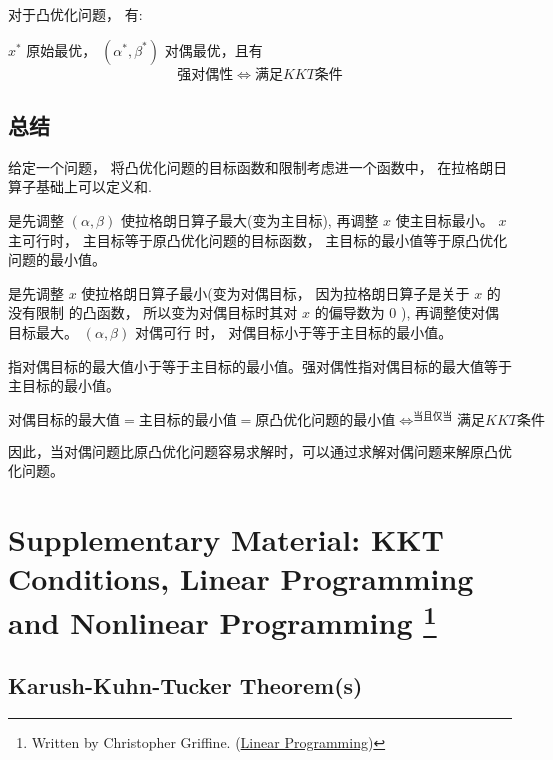 \begin{theorem}
    对于凸优化问题， 有:

$ x^{*} $ 原始最优， $ \left(\alpha^{*}, \beta^{*}\right) $ 对偶最优，且有\begin{equation} 强对偶性 \Leftrightarrow  满足  K K T  条件\end{equation}
\end{theorem}

\subsection{总结}


给定一个问题， 将凸优化问题的目标函数和限制考虑进一个函数中， 在拉格朗日算子基础上可以定义和.

是先调整 $ (\alpha, \beta) $ 使拉格朗日算子最大(变为主目标), 再调整 $ x $ 使主目标最小。 $ x $ 主可行时， 主目标等于原凸优化问题的目标函数， 主目标的最小值等于原凸优化问题的最小值。

是先调整 $ x $ 使拉格朗日算子最小(变为对偶目标， 因为拉格朗日算子是关于 $ x $ 的没有限制 的凸函数， 所以变为对偶目标时其对 $ x $ 的偏导数为 0 ), 再调整使对偶目标最大。 $ (\alpha, \beta) $ 对偶可行 时， 对偶目标小于等于主目标的最小值。

指对偶目标的最大值小于等于主目标的最小值。强对偶性指对偶目标的最大值等于主目标的最小值。

\begin{equation}对偶目标的最大值=主目标的最小值=原凸优化问题的最小值 \Leftrightarrow^{当且仅当}满足KKT条件\end{equation}

因此，当对偶问题比原凸优化问题容易求解时，可以通过求解对偶问题来解原凸优化问题。


\section[Supplementary Material: KKT Conditions, Linear Programming and Nonlinear Programming]{Supplementary Material: KKT Conditions, Linear Programming and Nonlinear Programming \footnote{Written by Christopher Griffine. (\href{http://www.personal.psu.edu/cxg286/LinearProgramming.html}{Linear Programming})}}



\subsection{Karush-Kuhn-Tucker Theorem(s)}

